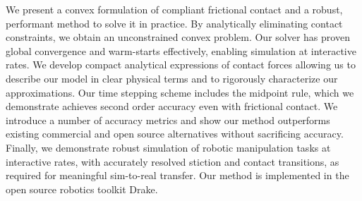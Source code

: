 We present a convex formulation of compliant frictional contact and a robust,
performant method to solve it in practice. By analytically eliminating contact
constraints, we obtain an unconstrained convex problem. Our solver has proven
global convergence and warm-starts effectively, enabling simulation at
interactive rates. We develop compact analytical expressions of contact forces
allowing us to describe our model in clear physical terms and to rigorously
characterize our approximations. Our time stepping scheme includes the midpoint
rule, which we demonstrate achieves second order accuracy even with frictional
contact. We introduce a number of accuracy metrics and show our method
outperforms existing commercial and open source alternatives without sacrificing
accuracy. Finally, we demonstrate robust simulation of robotic manipulation
tasks at interactive rates, with accurately resolved stiction and contact
transitions, as required for meaningful sim-to-real transfer. Our method is
implemented in the open source robotics toolkit Drake.
